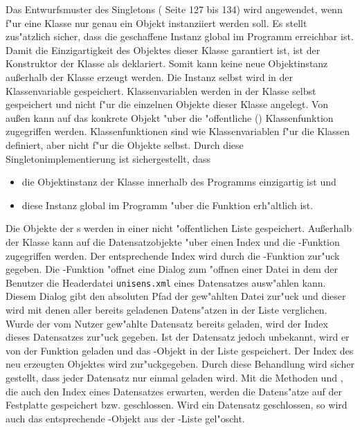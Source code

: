 Das Entwurfsmuster des Singletons (\cite{Gamma1995} Seite 127 bis 134) wird angewendet, wenn f"ur eine Klasse nur genau ein Objekt instanziiert werden soll.
Es stellt zus"atzlich sicher, dass die geschaffene Instanz global im Programm erreichbar ist.
Damit die Einzigartigkeit des Objektes dieser Klasse garantiert ist, ist der Konstruktor der Klasse als  deklariert.
Somit kann keine neue Objektinstanz au{\ss}erhalb der Klasse  erzeugt werden.
Die Instanz selbst wird in der Klassenvariable  gespeichert.
Klassenvariablen werden in der Klasse selbst gespeichert und nicht f"ur die einzelnen Objekte dieser Klasse angelegt.
Von au{\ss}en kann auf das konkrete Objekt "uber die "offentliche () Klassenfunktion  zugegriffen werden.
Klassenfunktionen sind wie Klassenvariablen f"ur die Klassen definiert, aber nicht f"ur die Objekte selbst.
Durch diese Singletonimplementierung ist sichergestellt, dass
\begin{itemize}
	\item die Objektinstanz  der Klasse  innerhalb des Programms einzigartig ist und
	\item diese Instanz global im Programm "uber die Funktion  erh"altlich ist.
\end{itemize}

Die Objekte der s werden in einer nicht "offentlichen Liste  gespeichert.
Au{\ss}erhalb der Klasse kann auf die Datensatzobjekte "uber einen Index und die -Funktion zugegriffen werden.
Der entsprechende Index wird durch die -Funktion zur"uck gegeben.
Die -Funktion "offnet eine Dialog zum "offnen einer Datei in dem der Benutzer die Headerdatei \verb|unisens.xml| eines Datensatzes ausw"ahlen kann.
Diesem Dialog gibt den absoluten Pfad der gew"ahlten Datei zur"uck und dieser wird mit denen aller bereits geladenen Datens"atzen in der Liste  verglichen.
Wurde der vom Nutzer gew"ahlte Datensatz bereits geladen, wird der Index dieses Datensatzes zur"uck gegeben.
Ist der Datensatz jedoch unbekannt, wird er von der Funktion geladen und das -Objekt in der Liste gespeichert.
Der Index des neu erzeugten Objektes wird zur"uckgegeben.
Durch diese Behandlung wird sicher gestellt, dass jeder Datensatz nur einmal geladen wird.
Mit die Methoden  und , die auch den Index eines Datensatzes erwarten, werden die Datens"atze auf der Festplatte gespeichert bzw. geschlossen.
Wird ein Datensatz geschlossen, so wird auch das entsprechende -Objekt aus der -Liste gel"oscht.

